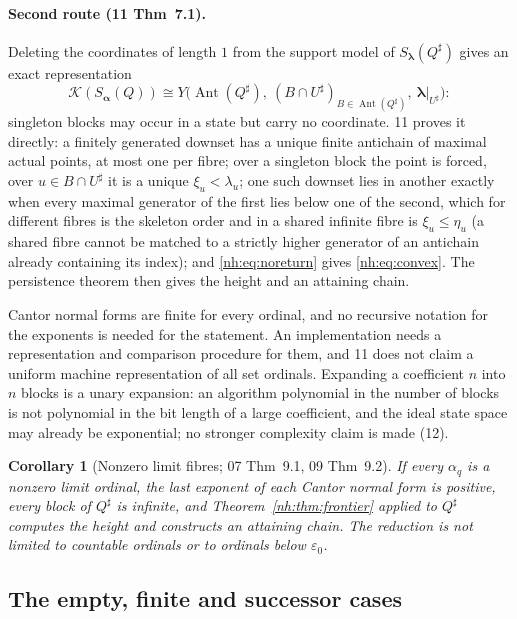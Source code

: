 \documentclass[11pt,a4paper]{article}
\newtheorem{corollary}[theorem]{Corollary}
\theoremstyle{definition}
\theoremstyle{remark}
\newcommand{\K}{\mathcal K}
\newcommand{\eps}{\varepsilon_0}
\newcommand{\Ant}{\operatorname{Ant}}
\begin{document}
\paragraph{Second route (11 Thm~7.1).} Deleting the coordinates of length $1$
from the support model of $S_{\boldsymbol\lambda}(Q^\sharp)$ gives an exact
representation
\begin{equation}\label{nh:eq:mixed}
 \K(S_{\boldsymbol\alpha}(Q))\cong
 Y\bigl(\Ant(Q^\sharp),\ (B\cap U^\sharp)_{B\in\Ant(Q^\sharp)},\ \boldsymbol\lambda|_{U^\sharp}\bigr):
\end{equation}
singleton blocks may occur in a state but carry no coordinate. 11 proves it
directly: a finitely generated downset has a unique finite antichain of maximal
actual points, at most one per fibre; over a singleton block the point is
forced, over $u\in B\cap U^\sharp$ it is a unique $\xi_u<\lambda_u$; one such
downset lies in another exactly when every maximal generator of the first lies
below one of the second, which for different fibres is the skeleton order and in
a shared infinite fibre is $\xi_u\le\eta_u$ (a shared fibre cannot be matched to
a strictly higher generator of an antichain already containing its index); and
\eqref{nh:eq:noreturn} gives \eqref{nh:eq:convex}. The persistence theorem then
gives the height and an attaining chain.

Cantor normal forms are finite for every ordinal, and no recursive notation
for the exponents is needed for the statement. An implementation needs a
representation and comparison procedure for them, and 11 does not claim a
uniform machine representation of all set ordinals. Expanding a coefficient
$n$ into $n$ blocks is a unary expansion: an algorithm polynomial in the number
of blocks is not polynomial in the bit length of a large coefficient, and the
ideal state space may already be exponential; no stronger complexity claim is
made (12).

\begin{corollary}[Nonzero limit fibres; 07 Thm~9.1, 09 Thm~9.2]\label{nh:cor:limits}
If every $\alpha_q$ is a nonzero limit ordinal, the last exponent of each
Cantor normal form is positive, every block of $Q^\sharp$ is infinite, and
Theorem~\ref{nh:thm:frontier} applied to $Q^\sharp$ computes the height and
constructs an attaining chain. The reduction is not limited to countable
ordinals or to ordinals below $\eps$.
\end{corollary}

\subsection{The empty, finite and successor cases}\label{nh:sec:finitecases}
\end{document}
